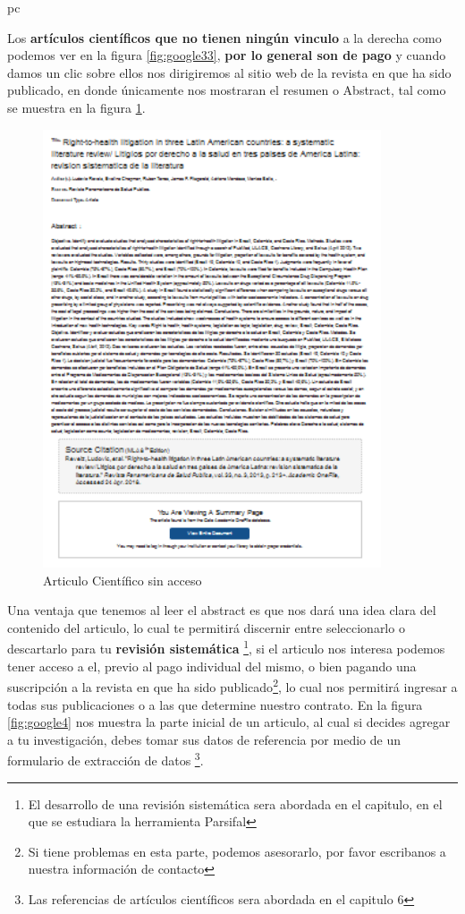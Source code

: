 pc\documentclass[a4paper,12pt,openany]{book}
\begin{document}
\begin{itemize}
Los \textbf{artículos científicos que no tienen ningún vinculo} a la derecha como podemos ver en la figura \ref{fig:google33}, \textbf{por lo general son de pago} y cuando damos un clic sobre ellos nos dirigiremos al sitio web de la revista en que ha sido publicado, en donde únicamente nos mostraran el resumen o Abstract, tal como se muestra en la figura \ref{fig:gogle55}.

\begin{figure}[ht]
  \centering
	\includegraphics[width=10cm]{google5.png}
\caption{Articulo Científico sin acceso}
  \label{fig:gogle55}
\end{figure}

Una ventaja que tenemos al leer el abstract es que nos dará una idea clara del contenido del articulo, lo cual te permitirá discernir entre seleccionarlo o descartarlo para tu \textbf{revisión sistemática} \footnote{El desarrollo de una revisión sistemática sera abordada en el capitulo, en el que se estudiara la herramienta Parsifal}, si el articulo nos interesa podemos tener acceso a el, previo al pago individual del mismo, o bien pagando una suscripción a la revista en que ha sido publicado\footnote{Si tiene problemas en esta parte, podemos asesorarlo, por favor escribanos a nuestra información de contacto}, lo cual nos permitirá ingresar a todas sus publicaciones o a las que determine nuestro contrato. En la figura \ref{fig:google4} nos muestra la parte inicial de un articulo, al cual si decides agregar a tu investigación, debes tomar sus datos de referencia por medio de un formulario de extracción de datos \footnote{Las referencias de artículos científicos sera abordada en el capitulo 6}. 


\end{itemize}
\end{document}
